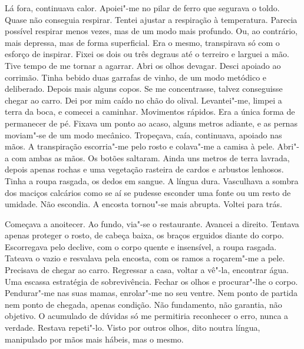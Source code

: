 Lá fora, continuava calor. Apoiei"-me no pilar de ferro que segurava o
toldo. Quase não conseguia respirar. Tentei ajustar a respiração à
temperatura. Parecia possível respirar menos vezes, mas de um modo mais
profundo. Ou, ao contrário, mais depressa, mas de forma superficial. Era
o mesmo, transpirava só com o esforço de inspirar. Fixei os dois ou três
degraus até o terreiro e larguei a mão. Tive tempo de me tornar a
agarrar. Abri os olhos devagar. Desci apoiado ao corrimão. Tinha bebido
duas garrafas de vinho, de um modo metódico e deliberado. Depois mais
alguns copos. Se me concentrasse, talvez conseguisse chegar ao carro.
Dei por mim caído no chão do olival. Levantei"-me, limpei a terra da
boca, e comecei a caminhar. Movimentos rápidos. Era a única forma de
permanecer de pé. Fixava um ponto ao acaso, alguns metros adiante, e as
pernas moviam"-se de um modo mecânico. Tropeçava, caía, continuava,
apoiado nas mãos. A transpiração escorria"-me pelo rosto e colava"-me a
camisa à pele. Abri"-a com ambas as mãos. Os botões saltaram. Ainda uns
metros de terra lavrada, depois apenas rochas e uma vegetação rasteira
de cardos e arbustos lenhosos. Tinha a roupa rasgada, os dedos em
sangue. A língua dura. Vasculhava a sombra dos maciços calcários como se
aí se pudesse esconder uma fonte ou um resto de umidade. Não escondia.
A encosta tornou"-se mais abrupta. Voltei para trás.

Começava a anoitecer. Ao fundo, via"-se o restaurante. Avancei a
direito. Tentava apenas proteger o rosto, de cabeça baixa, os braços
erguidos diante do corpo. Escorregava pelo declive, com o corpo quente e
insensível, a roupa rasgada. Tateava o vazio e resvalava pela encosta,
com os ramos a roçarem"-me a pele. Precisava de chegar ao carro.
Regressar a casa, voltar a vê"-la, encontrar água. Uma escassa
estratégia de sobrevivência. Fechar os olhos e procurar"-lhe o corpo.
Pendurar"-me nas suas mamas, enrolar"-me no seu ventre. Nem ponto de
partida nem ponto de chegada, apenas condição. Não fundamento, não
garantia, não objetivo. O acumulado de dúvidas só me permitiria
reconhecer o erro, nunca a verdade. Restava repeti"-lo. Visto por outros
olhos, dito noutra língua, manipulado por mãos mais hábeis, mas o mesmo.

